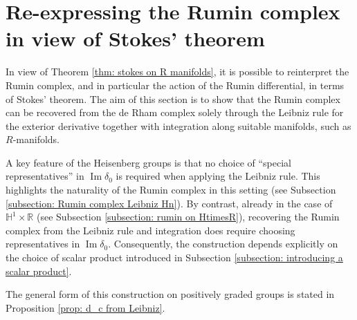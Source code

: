 \documentclass[dvipsnames]{amsart}
\theoremstyle{definition}
\theoremstyle{definition}
\numberwithin{equation}{section}
\newcommand{\R}{\mathbb{R}}
\renewcommand{\H}{\mathbb{H}}
\begin{document}
\section{Re-expressing the Rumin complex in view of Stokes' theorem}\label{section: Rumin leibniz}

In view of Theorem \ref{thm: stokes on R manifolds}, it is possible to reinterpret the Rumin complex, and in particular the action of the Rumin differential, in terms of Stokes' theorem. The aim of this section is to show that the Rumin complex can be recovered from the de Rham complex solely through the Leibniz rule for the exterior derivative together with integration along suitable manifolds, such as \(R\)-manifolds.

A key feature of the Heisenberg groups is that no choice of ``special representatives'' in \(\operatorname{Im}\delta_0\) is required when applying the Leibniz rule. This highlights the naturality of the Rumin complex in this setting (see Subsection \ref{subsection: Rumin complex Leibniz Hn}). By contrast, already in the case of \(\H^1\times\R\) (see Subsection \ref{subsection: rumin on HtimesR}), recovering the Rumin complex from the Leibniz rule and integration does require choosing representatives in \(\operatorname{Im}\delta_0\). Consequently, the construction depends explicitly on the choice of scalar product introduced in Subsection \ref{subsection: introducing a scalar product}.

The general form of this construction on positively graded groups is stated in Proposition \ref{prop: d_c from Leibniz}.
\end{document}
